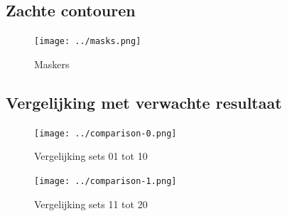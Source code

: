 \documentclass[10pt,a4paper]{article}
\begin{document}
\subsection*{Zachte contouren}

\begin{figure}[H]
\centering
\texttt{[image: ../masks.png]}
\caption{Maskers}
\label{fig:masks}
\end{figure}

\subsection*{Vergelijking met verwachte resultaat}
\label{appendix:comparison}

\begin{figure}[H]
\centering
\texttt{[image: ../comparison-0.png]}
\caption{Vergelijking sets 01 tot 10}
\label{fig:comparison-0}
\end{figure}

\begin{figure}[H]
\centering
\texttt{[image: ../comparison-1.png]}
\caption{Vergelijking sets 11 tot 20}
\label{fig:comparison-1}
\end{figure}
\end{document}
